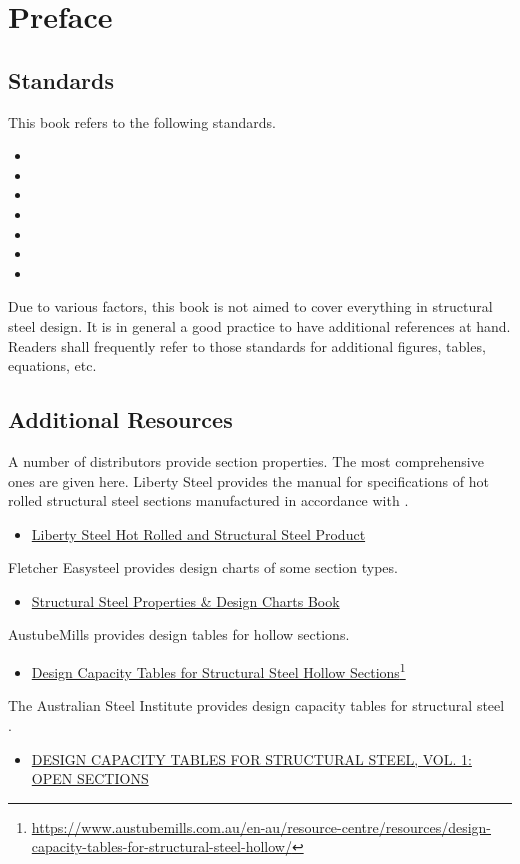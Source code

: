 \chapter{Preface}
\section{Standards}
This book refers to the following standards.
\begin{itemize}
\item \ASNZSACTION{}
\item \NZSSTEEL{}
\item \ASNZSSTEEL{}
\item \ASNZSPLATE{}
\item \ASNZSCOLD{}
\item \ASNZSWELD{}
\item \ANSI{}
\end{itemize}
Due to various factors, this book is not aimed to cover everything in structural steel design. It is in general a good practice to have additional references at hand. Readers shall frequently refer to those standards for additional figures, tables, equations, etc.
\section{Additional Resources}
A number of distributors provide section properties. The most comprehensive ones are given here. Liberty Steel provides the manual for specifications of hot rolled structural steel sections manufactured in accordance with \ASNZSSTEEL{}.
\begin{itemize}
\item \href{run:./REF/HOT.ROLLED.AND.STRUCTURAL.STEEL.PRODUCT.pdf}{Liberty Steel Hot Rolled and Structural Steel Product}
\end{itemize}
Fletcher Easysteel provides design charts of some section types.
\begin{itemize}
\item \href{run:./REF/STRUCTURAL.STEEL.PROPERTIES.DESIGN.CHARTS.BOOK.pdf}{Structural Steel Properties \& Design Charts Book}
\end{itemize}
AustubeMills provides design tables for hollow sections.
\begin{itemize}
\item \href{https://www.austubemills.com.au/en-au/resource-centre/resources/design-capacity-tables-for-structural-steel-hollow/}{Design Capacity Tables for Structural Steel Hollow Sections}\footnote{\url{https://www.austubemills.com.au/en-au/resource-centre/resources/design-capacity-tables-for-structural-steel-hollow/}}
\end{itemize}
The Australian Steel Institute provides design capacity tables for structural steel \citep{ASI2016}.
\begin{itemize}
\item \href{https://www.steel.org.au/resources/bookshop/products/design-capacity-tables-for-structural-steel,-vol/}{DESIGN CAPACITY TABLES FOR STRUCTURAL STEEL, VOL. 1: OPEN SECTIONS}
\end{itemize}

